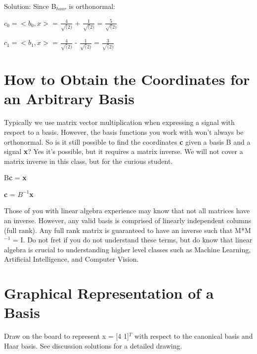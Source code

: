 \documentclass[11pt]{article}
\begin{document}
\color{blue}
Solution:
Since B$_{haar}$ is orthonormal:

\begin{center}

$c_0 = <b_0,x>$ = $\frac{4}{\sqrt(2)}$ + $\frac{1}{\sqrt(2)}$ = $\frac{5}{\sqrt(2)}$

\end{center}
\begin{center}

$c_1= <b_1,x>$ = $\frac{4}{\sqrt(2)}$ - $\frac{1}{\sqrt(2)}$ = $\frac{3}{\sqrt(2)}$

\end{center}

\color{black}

\section{How to Obtain the Coordinates for an Arbitrary Basis}
Typically we use matrix vector multiplication when expressing a signal with respect to a basis. However, the basis functions you work with won't always be orthonormal. So is it still possible to find the coordinates \textbf{c} given a basis B and a signal \textbf{x}? Yes it's possible, but it requires a matrix inverse. We will not cover a matrix inverse in this class, but for the curious student.

\begin{center}
B\textbf{c} = \textbf{x} 
\end{center}

\begin{center}
\textbf{c} = $B^{-1}$\textbf{x} 
\end{center}

Those of you with linear algebra experience may know that not all matrices have an inverse. However, any valid basis is comprised of linearly independent columns (full rank). Any full rank matrix is guaranteed to have an inverse such that M*M$^{-1}$ = I. Do not fret if you do not understand these terms, but do know that linear algebra is crucial to understanding higher level classes such as Machine Learning, Artificial Intelligence, and Computer Vision.

\section{Graphical Representation of a Basis}

Draw on the board to represent x = [4 1]$^T$ with respect to the canonical basis and Haar basis. See discussion solutions for a detailed drawing.
\end{document}

